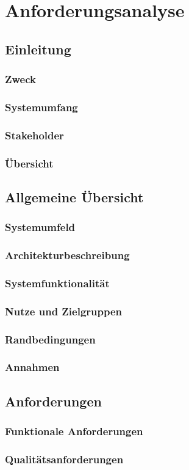 \chapter{Anforderungsanalyse}

%


\section{Einleitung}
\subsection{Zweck}

\subsection{Systemumfang}

\subsection{Stakeholder}

\subsection{Übersicht}


\section{Allgemeine Übersicht}
\subsection{Systemumfeld}
\subsection{Architekturbeschreibung}
\subsection{Systemfunktionalität}
\subsection{Nutze und Zielgruppen}
\subsection{Randbedingungen}
\subsection{Annahmen}


\section{Anforderungen}

\subsection{Funktionale Anforderungen}

\subsection{Qualitätsanforderungen}



